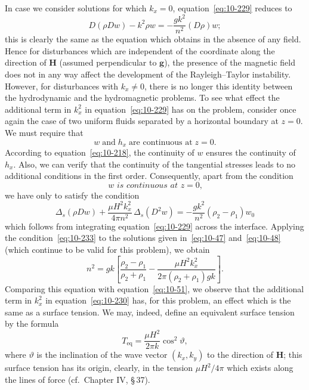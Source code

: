 In case we consider solutions for which $k_x = 0$, equation~\eqref{eq:10-229} reduces to
\begin{equation}
\label{eq:10-230}
D(\rho Dw) - k^2\rho w = -\frac{gk^2}{n^2}(D\rho)w;
\end{equation}
this is clearly the same as the equation which obtains in the absence of any field. Hence for disturbances which are independent of the coordinate along the direction of $\mathbf{H}$ (assumed perpendicular to $\mathbf{g}$), the presence of the magnetic field does not in any way affect the development of the Rayleigh--Taylor instability. However, for disturbances with $k_x \neq 0$, there is no longer this identity between the hydrodynamic and the hydromagnetic problems. To see what effect the additional term in $k_x^2$ in equation~\eqref{eq:10-229} has on the problem, consider once again the case of two uniform fluids separated by a horizontal boundary at $z = 0$. We must require that
\begin{equation}
\label{eq:10-231}
w\;\text{and}\; h_x\;\text{are continuous at}\; z = 0.
\end{equation}
According to equation~\eqref{eq:10-218}, the continuity of $w$ ensures the continuity of $h_x$. Also, we can verify that the continuity of the tangential stresses leads to no additional conditions in the first order. Consequently, apart from the condition
\begin{equation}
\label{eq:10-232}
\textit{$w$ is continuous at $z = 0$,}
\end{equation}
we have only to satisfy the condition
\begin{equation}
\label{eq:10-233}
\Delta_s(\rho Dw) + \frac{\mu H^2 k_x^2}{4\pi n^2}\,\Delta_s(D^2w) = -\frac{gk^2}{n^2}(\rho_2-\rho_1)w_0
\end{equation}
which follows from integrating equation~\eqref{eq:10-229} across the interface. Applying the condition~\eqref{eq:10-233} to the solutions given in~\eqref{eq:10-47} and~\eqref{eq:10-48} (which continue to be valid for this problem), we obtain
\begin{equation}
\label{eq:10-234}
n^2 = gk\!\left[\frac{\rho_2-\rho_1}{\rho_2+\rho_1}-\frac{\mu H^2 k_x^2}{2\pi(\rho_2+\rho_1)gk}\right]\!.
\end{equation}
Comparing this equation with equation~\eqref{eq:10-51}, we observe that the additional term in $k_x^2$ in equation~\eqref{eq:10-230} has, for this problem, an effect which is the same as a surface tension. We may, indeed, define an equivalent surface tension by the formula
\begin{equation}
\label{eq:10-235}
T_{\text{eq}} = \frac{\mu H^2}{2\pi k}\cos^2\!\vartheta,
\end{equation}
where $\vartheta$ is the inclination of the wave vector $(k_x, k_y)$ to the direction of $\mathbf{H}$; this surface tension has its origin, clearly, in the tension $\mu H^2/4\pi$ which exists along the lines of force (cf.\ Chapter IV, \S\,37).

